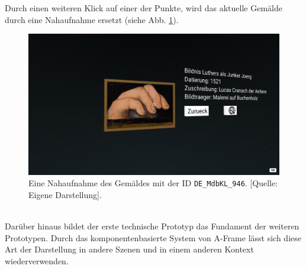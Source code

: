 \documentclass[a4paper,12pt,oneside]{article}
\begin{document}
        Durch einen weiteren Klick auf einer der Punkte, wird das
        aktuelle Gemälde durch eine Nahaufnahme ersetzt
        (siehe Abb. \ref{fig:paintings-builder5}).
        \begin{figure}
          \centering
          \includegraphics[scale=0.3]{img/coding/paintings-builder5.png}
          \caption[Eine Nahaufnahme des Gemäldes mit der ID \texttt{DE\_MdbKL\_946}.]{Eine Nahaufnahme des Gemäldes mit der ID \texttt{DE\_MdbKL\_946}. [Quelle: Eigene Darstellung].}
          \label{fig:paintings-builder5}
        \end{figure} \\
        Darüber hinaus bildet der erste technische Prototyp das Fundament
        der weiteren Prototypen. Durch das komponentenbasierte System von
        A-Frame lässt sich diese Art der Darstellung in andere Szenen
        und in einem anderen Kontext wiederverwenden. \newpage
\end{document}
